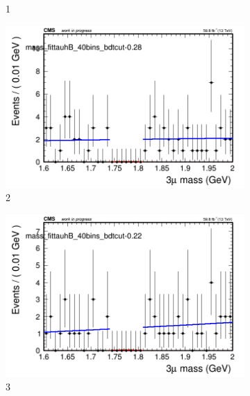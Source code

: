 \begin{figure}[h!]
\begin{subfigure}{0.2\textwidth}
        \caption{1}
    \end{subfigure}
    \begin{subfigure}{0.2\textwidth}
        \includegraphics[width=\textwidth]{power_law/plots/tauhB/massfit_tauhB_40bins_bdtcut-0.28.png}
        \caption{2}
    \end{subfigure}
    \begin{subfigure}{0.2\textwidth}
        \includegraphics[width=\textwidth]{power_law/plots/tauhB/massfit_tauhB_40bins_bdtcut-0.22.png}
        \caption{3}
    \end{subfigure}
    \begin{subfigure}{0.2\textwidth}

\end{subfigure}
\end{figure}
